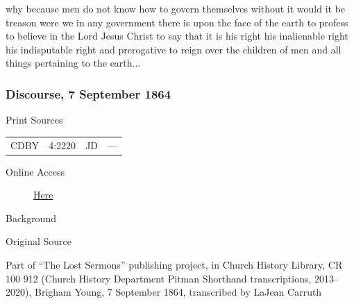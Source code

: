 why because men do not know how to govern themselves without it would it be treason were we in any government there is upon the face of the earth to profess to believe in the Lord Jesus Christ to say that it is his right his inalienable right his indisputable right and prerogative to reign over the children of men and all things pertaining to the earth...
			
		\subsubsection{Discourse, 7 September 1864}
			\label{EMS-1864-BY-7-SEP-1864}
			
			\begin{description}
					\item[Print Sources]
				\end{description}

					\begin{tabular}{p{0.5in}p{1in}p{0.5in}p{1in}}
					CDBY	& 4:2220		& JD 		& --- \\
					\end{tabular}
				
				\begin{description}
					\item[Online Access] \href{https://catalog.churchofjesuschrist.org/assets/92e3ef48-c3c0-4d38-85d9-96e90d2b4fc6/0/0}{Here}
				\end{description}
				
				\begin{description}
					\item[Background]
				\end{description}
				
					\phantom{.}
				
				\begin{description}
					\item[Original Source]
				\end{description}
				
					Part of ``The Lost Sermons'' publishing project, in Church History Library, CR 100 912 (Church History Department Pitman Shorthand transcriptions, 2013--2020), Brigham Young, 7 September 1864, transcribed by LaJean Carruth
				
